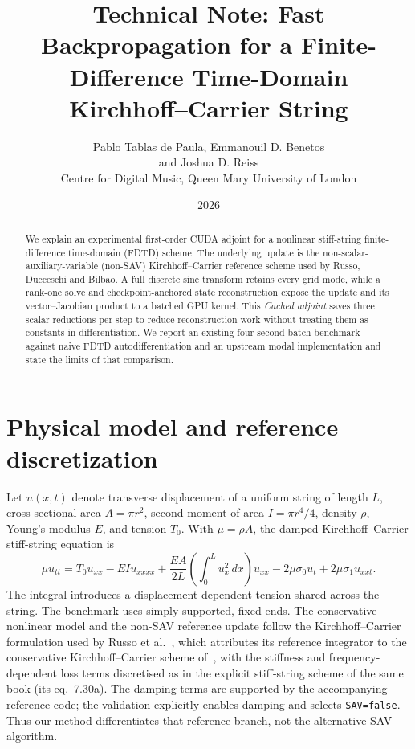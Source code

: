 \documentclass[a4paper,10pt]{article}
\title{Technical Note: Fast Backpropagation for a Finite-Difference Time-Domain Kirchhoff--Carrier String}
\author{Pablo Tablas de Paula, Emmanouil D. Benetos\\ and Joshua D. Reiss\\[0.4em] Centre for Digital Music, Queen Mary University of London}
\date{2026}
\begin{document}
\maketitle
\begin{abstract}
We explain an experimental first-order CUDA adjoint for a nonlinear stiff-string finite-difference time-domain (FDTD) scheme. The underlying update is the non-scalar-auxiliary-variable (non-SAV) Kirchhoff--Carrier reference scheme used by Russo, Ducceschi and Bilbao. A full discrete sine transform retains every grid mode, while a rank-one solve and checkpoint-anchored state reconstruction expose the update and its vector--Jacobian product to a batched GPU kernel. This \emph{Cached adjoint} saves three scalar reductions per step to reduce reconstruction work without treating them as constants in differentiation. We report an existing four-second batch benchmark against naive FDTD autodifferentiation and an upstream modal implementation and state the limits of that comparison.
\end{abstract}

\section{Physical model and reference discretization}
Let $u(x,t)$ denote transverse displacement of a uniform string of length $L$, cross-sectional area $A=\pi r^{2}$, second moment of area $I=\pi r^{4}/4$, density $\rho$, Young's modulus $E$, and tension $T_0$. With $\mu=\rho A$, the damped Kirchhoff--Carrier stiff-string equation is
\begin{equation}
 \mu u_{tt}=T_0u_{xx}-EIu_{xxxx}
 +\frac{EA}{2L}\left(\int_0^L u_x^2\,dx\right)u_{xx}
 -2\mu\sigma_0u_t+2\mu\sigma_1u_{xxt}.
 \label{eq:pde}
\end{equation}
The integral introduces a displacement-dependent tension shared across the string. The benchmark uses simply supported, fixed ends. The conservative nonlinear model and the non-SAV reference update follow the Kirchhoff--Carrier formulation used by Russo et al.\ \cite{russo2026}, which attributes its reference integrator to the conservative Kirchhoff--Carrier scheme of\ \cite[Sec.~8.1.2]{bilbao2009}, with the stiffness and frequency-dependent loss terms discretised as in the explicit stiff-string scheme of the same book (its eq.~7.30a). The damping terms are supported by the accompanying reference code; the validation explicitly enables damping and selects \texttt{SAV=false}. Thus our method differentiates that reference branch, not the alternative SAV algorithm.
\end{document}
